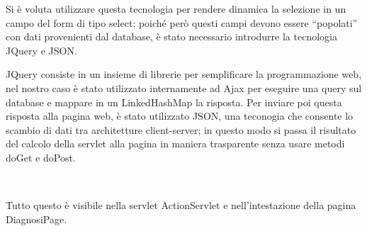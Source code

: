 \documentclass[a4paper,titlepage]{article}
\begin{document}
Si è voluta utilizzare questa tecnologia per rendere dinamica la selezione in un campo del form di tipo select; poiché però questi campi devono essere ``popolati'' con dati provenienti dal database, è stato necessario introdurre la tecnologia JQuery e JSON.

JQuery consiste in un insieme di librerie per semplificare la programmazione web, nel nostro caso è stato utilizzato internamente ad Ajax per eseguire una query sul database e mappare in un LinkedHashMap la risposta. Per inviare poi questa risposta alla pagina web, è stato utilizzato JSON, una teconogia che consente lo scambio di dati tra architetture client-server; in questo modo si passa il risultato del calcolo della servlet alla pagina in maniera trasparente senza usare metodi doGet e doPost.

~

Tutto questo è visibile nella servlet ActionServlet e nell'intestazione della pagina DiagnosiPage.
\end{document}
